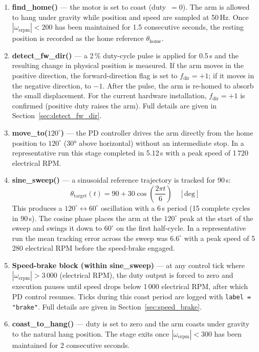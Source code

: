 \documentclass[12pt,a4paper]{article}
\begin{document}
\begin{enumerate}
  \item \textbf{find\_home()} --- the motor is set to coast (duty~$= 0$).
    The arm is allowed to hang under gravity while position and speed are
    sampled at 50\,Hz.  Once $|\omega_{\text{erpm}}| < 200$ has been
    maintained for 1.5 consecutive seconds, the resting position is
    recorded as the home reference $\theta_{\text{home}}$.

  \item \textbf{detect\_fw\_dir()} --- a 2\,\% duty-cycle pulse is applied
    for 0.5\,s and the resulting change in physical position is measured.
    If the arm moves in the positive direction, the forward-direction flag
    is set to $f_{\text{dir}} = +1$; if it moves in the negative direction,
    to $-1$.  After the pulse, the arm is re-homed to absorb the small
    displacement.  For the current hardware installation,
    $f_{\text{dir}} = +1$ is confirmed (positive duty raises the arm).
    Full details are given in Section~\ref{sec:detect_fw_dir}.

  \item \textbf{move\_to($120^\circ$)} --- the PD controller drives the arm
    directly from the home position to $120^\circ$ (30° above horizontal)
    without an intermediate stop.  In a representative run this stage
    completed in 5.12\,s with a peak speed of 1\,720 electrical RPM.

  \item \textbf{sine\_sweep()} --- a sinusoidal reference trajectory is
    tracked for 90\,s:
    \begin{equation}
      \theta_{\text{target}}(t)
        = 90 + 30\cos\!\left(\frac{2\pi t}{6}\right)
        \quad [\text{deg}]
    \end{equation}
    This produces a $120^\circ \leftrightarrow 60^\circ$ oscillation
    with a 6\,s period (15 complete cycles in 90\,s). The cosine phase
    places the arm at the $120^\circ$ peak at the start of the sweep and
    swings it down to $60^\circ$ on the first half-cycle.  In a
    representative run the mean tracking error across the sweep was
    $6.6^\circ$ with a peak speed of 5\,280 electrical RPM before the
    speed-brake engaged.

  \item \textbf{Speed-brake block (within sine\_sweep)} --- at any control
    tick where $|\omega_{\text{erpm}}| > 3\,000$ (electrical RPM),
    the duty output is forced to zero and execution pauses until speed
    drops below 1\,000 electrical RPM, after which PD control resumes.
    Ticks during this coast period are logged with
    \texttt{label = "brake"}. Full details are given in
    Section~\ref{sec:speed_brake}.

  \item \textbf{coast\_to\_hang()} --- duty is set to zero and the arm
    coasts under gravity to the natural hang position.  The stage exits
    once $|\omega_{\text{erpm}}| < 300$ has been maintained for
    2 consecutive seconds.
\end{enumerate}
\end{document}
